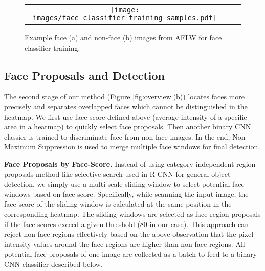 \documentclass[10pt,twocolumn,letterpaper]{article}
\begin{document}

\begin{figure*}
\begin{tabular}{ccc}
\rule{0pt}{1ex}\hspace{2.24mm}\texttt{[image: images/face\_classifier\_training\_samples.pdf]}\\[-0.1pt]
\end{tabular}
\caption{Example face (a) and non-face (b) images from AFLW for face classifier training.}
\label{fig:training_example}
\end{figure*}


\subsection{Face Proposals and Detection}

The second stage of our method (Figure \ref{fig:overview}(b)) locates faces more precisely and separates overlapped faces which cannot be distinguished in the heatmap. We first use face-score defined above (average intensity of a specific area in a heatmap) to quickly select face proposals. Then another binary CNN classier is trained to discriminate face from non-face images. In the end, Non-Maximum Suppression is used to merge multiple face windows for final detection.

{\bf Face Proposals by Face-Score.} Instead of using category-independent region proposals method like selective search \cite{uijlings2013selective} used in R-CNN \cite{girshick2014rich} for general object detection, we simply use a multi-scale sliding window to select potential face windows based on face-score. Specifically, while scanning the input image, the face-score of the sliding window is calculated at the same position in the corresponding heatmap. The sliding windows are selected as face region proposals if the face-scores exceed a given threshold (80 in our case). This approach can reject non-face regions effectively based on the above observation that the pixel intensity values around the face regions are higher than non-face regions. All potential face proposals of one image are collected as a batch to feed to a binary CNN classifier described below.
\end{document}
